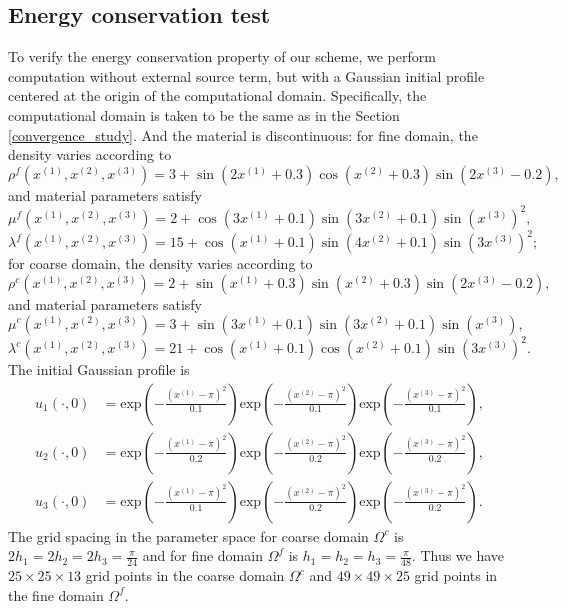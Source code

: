\subsection{Energy conservation test}\label{conserved_energy}
To verify the energy conservation property of our scheme, we perform computation without external source term, but with a Gaussian initial profile  centered at the origin of the computational domain.  Specifically, the computational domain is taken to be the same as in the Section \ref{convergence_study}. And the material is discontinuous: for fine domain,  the density varies according to
\[\rho^f(x^{(1)},x^{(2)},x^{(3)}) = 3 + \sin(2x^{(1)}+0.3)\cos(x^{(2)}+0.3)\sin(2x^{(3)}-0.2),\] 
and material parameters satisfy
\[\mu^f(x^{(1)},x^{(2)},x^{(3)}) = 2 + \cos(3x^{(1)}+0.1)\sin(3x^{(2)}+0.1)\sin(x^{(3)})^2,\]
\[\lambda^f(x^{(1)},x^{(2)},x^{(3)}) = 15 + \cos(x^{(1)}+0.1)\sin(4x^{(2)}+0.1)\sin(3x^{(3)})^2;\]
for coarse domain, the density varies according to
\[\rho^c(x^{(1)},x^{(2)},x^{(3)}) = 2 + \sin(x^{(1)}+0.3)\sin(x^{(2)}+0.3)\sin(2x^{(3)}-0.2),\] 
and material parameters satisfy
\[\mu^c(x^{(1)},x^{(2)},x^{(3)}) = 3 + \sin(3x^{(1)}+0.1)\sin(3x^{(2)}+0.1)\sin(x^{(3)}),\]
\[\lambda^c(x^{(1)},x^{(2)},x^{(3)}) = 21 + \cos(x^{(1)}+0.1)\cos(x^{(2)}+0.1)\sin(3x^{(3)})^2.\]
The initial Gaussian profile is
\begin{align*}
	u_1(\cdot,0) &= \mbox{exp}\left(-\frac{(x^{(1)}-\pi)^2}{0.1}\right)\mbox{exp}\left(-\frac{(x^{(2)}-\pi)^2}{0.1}\right)\mbox{exp}\left(-\frac{(x^{(3)}-\pi)^2}{0.1}\right),\\
	u_2(\cdot,0) &= \mbox{exp}\left(-\frac{(x^{(1)}-\pi)^2}{0.2}\right)\mbox{exp}\left(-\frac{(x^{(2)}-\pi)^2}{0.2}\right)\mbox{exp}\left(-\frac{(x^{(3)}-\pi)^2}{0.2}\right),\\
	u_3(\cdot,0) &= \mbox{exp}\left(-\frac{(x^{(1)}-\pi)^2}{0.1}\right)\mbox{exp}\left(-\frac{(x^{(2)}-\pi)^2}{0.2}\right)\mbox{exp}\left(-\frac{(x^{(3)}-\pi)^2}{0.2}\right).
\end{align*}
 The grid spacing in the parameter space for coarse domain $\Omega^c$ is $2h_1 = 2h_2 = 2h_3 = \frac{\pi}{24}$ and for fine domain $\Omega^f$ is $h_1 = h_2 = h_3 = \frac{\pi}{48}$. Thus we have $25\times25\times13$ grid points in the coarse domain $\Omega^c$ and $49\times49\times25$ grid points in the fine domain $\Omega^f$. 

